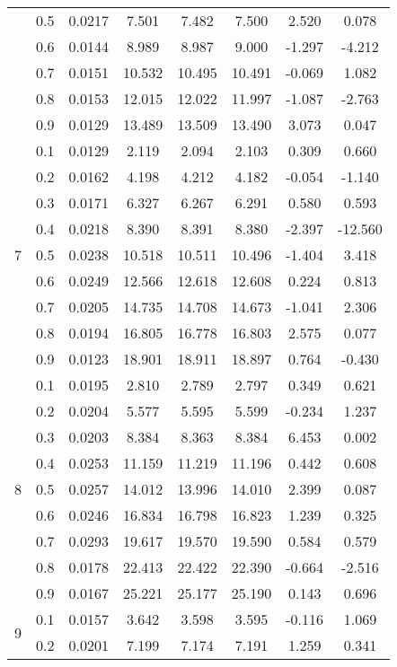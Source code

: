 \documentclass[11pt,a4paper]{report}
\begin{document}
\begin{longtable}{ | c | c || c | c | c | c | c | c | }
 & 0.5 & 0.0217 & 7.501 & 7.482 & 7.500 & 2.520 & 0.078 \\
 & 0.6 & 0.0144 & 8.989 & 8.987 & 9.000 & -1.297 & -4.212 \\
 & 0.7 & 0.0151 & 10.532 & 10.495 & 10.491 & -0.069 & 1.082 \\
 & 0.8 & 0.0153 & 12.015 & 12.022 & 11.997 & -1.087 & -2.763 \\
 & 0.9 & 0.0129 & 13.489 & 13.509 & 13.490 & 3.073 & 0.047 \\
 \hline
\multirow{9}{*}{7} & 0.1 & 0.0129 & 2.119 & 2.094 & 2.103 & 0.309 & 0.660 \\
 & 0.2 & 0.0162 & 4.198 & 4.212 & 4.182 & -0.054 & -1.140 \\
 & 0.3 & 0.0171 & 6.327 & 6.267 & 6.291 & 0.580 & 0.593 \\
 & 0.4 & 0.0218 & 8.390 & 8.391 & 8.380 & -2.397 & -12.560 \\
 & 0.5 & 0.0238 & 10.518 & 10.511 & 10.496 & -1.404 & 3.418 \\
 & 0.6 & 0.0249 & 12.566 & 12.618 & 12.608 & 0.224 & 0.813 \\
 & 0.7 & 0.0205 & 14.735 & 14.708 & 14.673 & -1.041 & 2.306 \\
 & 0.8 & 0.0194 & 16.805 & 16.778 & 16.803 & 2.575 & 0.077 \\
 & 0.9 & 0.0123 & 18.901 & 18.911 & 18.897 & 0.764 & -0.430 \\
 \hline
\multirow{9}{*}{8} & 0.1 & 0.0195 & 2.810 & 2.789 & 2.797 & 0.349 & 0.621 \\
 & 0.2 & 0.0204 & 5.577 & 5.595 & 5.599 & -0.234 & 1.237 \\
 & 0.3 & 0.0203 & 8.384 & 8.363 & 8.384 & 6.453 & 0.002 \\
 & 0.4 & 0.0253 & 11.159 & 11.219 & 11.196 & 0.442 & 0.608 \\
 & 0.5 & 0.0257 & 14.012 & 13.996 & 14.010 & 2.399 & 0.087 \\
 & 0.6 & 0.0246 & 16.834 & 16.798 & 16.823 & 1.239 & 0.325 \\
 & 0.7 & 0.0293 & 19.617 & 19.570 & 19.590 & 0.584 & 0.579 \\
 & 0.8 & 0.0178 & 22.413 & 22.422 & 22.390 & -0.664 & -2.516 \\
 & 0.9 & 0.0167 & 25.221 & 25.177 & 25.190 & 0.143 & 0.696 \\
 \hline
\multirow{9}{*}{9} & 0.1 & 0.0157 & 3.642 & 3.598 & 3.595 & -0.116 & 1.069 \\
 & 0.2 & 0.0201 & 7.199 & 7.174 & 7.191 & 1.259 & 0.341 \\

\end{longtable}
\end{document}
